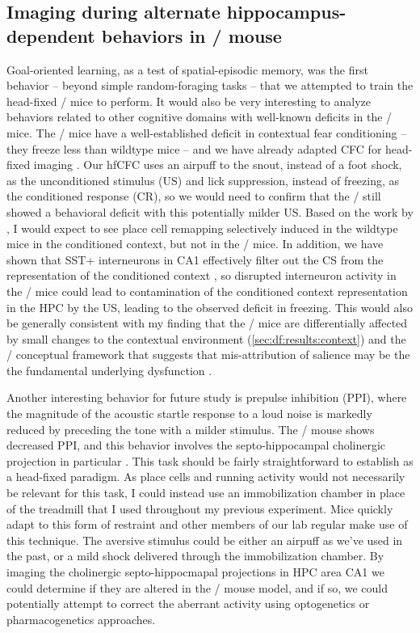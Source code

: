 \subsection{Imaging during alternate hippocampus-dependent behaviors in \df/ mouse}
Goal-oriented learning, as a test of spatial-episodic memory, was the first behavior -- beyond simple random-foraging tasks -- that we attempted to train the head-fixed \df/ mice to perform.
It would also be very interesting to analyze behaviors related to other cognitive domains with well-known deficits in the \df/ mice.
The \df/ mice have a well-established deficit in contextual fear conditioning \citep[CFC,][]{Stark2008} -- they freeze less than wildtype mice -- and we have already adapted CFC for head-fixed imaging \citep[hfCFC,][]{Lovett-Barron2014}.
Our hfCFC uses an airpuff to the snout, instead of a foot shock, as the unconditioned stimulus (US) and lick suppression, instead of freezing, as the conditioned response (CR), so we would need to confirm that the \df/ still showed a behavioral deficit with this potentially milder US.
Based on the work by \citeauthor{Moita2004}, I would expect to see place cell remapping selectively induced in the wildtype mice in the conditioned context, but not in the \df/ mice.
In addition, we have shown that SST+ interneurons in CA1 effectively filter out the CS from the representation of the conditioned context \citep{Lovett-Barron2014}, so disrupted interneuron activity in the \df/ mice could lead to contamination of the conditioned context representation in the \ac{HPC} by the US, leading to the observed deficit in freezing.
This would also be generally consistent with my finding that the \df/ mice are differentially affected by small changes to the contextual environment (\autoref{sec:df:results:context}) and the \scz/ conceptual framework that suggests that mis-attribution of salience may be the the fundamental underlying dysfunction \citep{Kapur2003a, VanOs2009}.

Another interesting behavior for future study is prepulse inhibition (PPI), where the magnitude of the acoustic startle response to a loud noise is markedly reduced by preceding the tone with a milder stimulus.
The \df/ mouse shows decreased PPI, and this behavior involves the septo-hippocampal cholinergic projection in particular \citep{Koch1996, Swerdlow2001}.
This task should be fairly straightforward to establish as a head-fixed paradigm.
As place cells and running activity would not necessarily be relevant for this task, I could instead use an immobilization chamber in place of the treadmill that I used throughout my previous experiment.
Mice quickly adapt to this form of restraint and other members of our lab regular make use of this technique.
The aversive stimulus could be either an airpuff as we've used in the past, or a mild shock delivered through the immobilization chamber.
By imaging the cholinergic septo-hippocmapal projections in HPC area CA1 we could determine if they are altered in the \df/ mouse model, and if so, we could potentially attempt to correct the aberrant activity using optogenetics or pharmacogenetics approaches.

